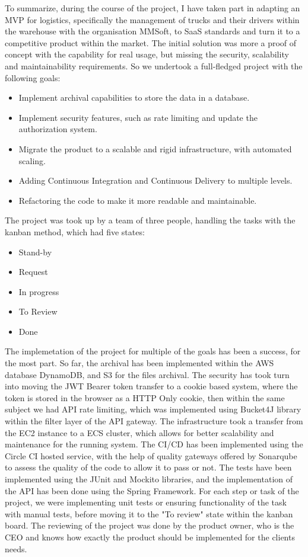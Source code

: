 To summarize, during the course of the project, I have taken part in adapting an MVP
for logistics, specifically the management of trucks and their drivers within the 
warehouse with the organisation MMSoft, to SaaS standards and turn it to a competitive
product within the market. The initial solution was more a proof of concept with the 
capability for real usage, but missing the security, scalability and maintainability
requirements. So we undertook a full-fledged project with the following goals:
    \begin{itemize}
        \item Implement archival capabilities to store the data in a database.
        \item Implement security features, such as rate limiting and update the authorization system.
        \item Migrate the product to a scalable and rigid infrastructure, with automated scaling.
        \item Adding Continuous Integration and Continuous Delivery to multiple levels.
        \item Refactoring the code to make it more readable and maintainable.
    \end{itemize}

The project was took up by a team of three people, handling the tasks with
the kanban method, which had five states:
    \begin{itemize}
        \item Stand-by
        \item Request
        \item In progress
        \item To Review
        \item Done
    \end{itemize}

The implemetation of the project for multiple of the goals has been a success, for
the most part. So far, the archival has been implemented within the AWS database
DynamoDB, and S3 for the files archival. The security has took turn into moving 
the JWT Bearer token transfer to a cookie based system, where the token is stored
in the browser as a HTTP Only cookie, then within the same subject we had API 
rate limiting, which was implemented using Bucket4J library within the filter layer
of the API gateway. The infrastructure took a transfer from the EC2 instance to 
a ECS cluster, which allows for better scalability and maintenance for the running 
system. The CI/CD has been implemented using the Circle CI hosted service,
with the help of quality gateways offered by Sonarqube to assess the quality of the
code to allow it to pass or not.
The tests have been implemented using the JUnit and Mockito libraries, and the
implementation of the API has been done using the Spring Framework.
For each step or task of the project, we were implementing unit tests or ensuring
functionality of the task with manual tests, before moving it to the "To review" state
within the kanban board.
The reviewing of the project was done by the product owner, who is the CEO and 
knows how exactly the product should be implemented for the clients needs.

